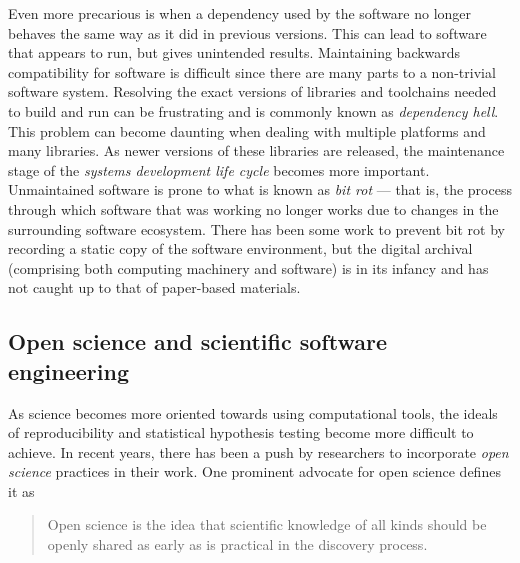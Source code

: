{ %
	Even more precarious is when a dependency used by the
	software no longer behaves the same way as it did in
	previous versions. This can lead to software that appears
	to run, but gives unintended results.  Maintaining
	backwards compatibility for software is difficult since
	there are many parts to a non-trivial software system.
	Resolving the exact versions of libraries and toolchains
	needed to build and run can be frustrating and is commonly
	known as \emph{dependency hell}. This problem can become
	daunting when dealing with multiple platforms and many
	libraries. As newer versions of these libraries are
	released, the maintenance stage of the \emph{systems
	development life cycle} becomes more important.
	Unmaintained software is prone to what is known as
	\emph{bit rot} --- that is, the process through which
	software that was working no longer works due to changes
	in the surrounding software ecosystem.
	There has been some work to prevent bit rot by recording a
	static copy of the software environment, but the digital
	archival (comprising both computing machinery and
	software) is in its infancy and has not caught up to that
	of paper-based materials.
}


\subsection{Open science and scientific software engineering}

As science becomes more oriented towards using computational
tools, the ideals of reproducibility and statistical hypothesis
testing become more difficult to achieve. In recent years, there
has been a push by researchers to incorporate \emph{open science}
practices in their work. One prominent advocate for open science
defines it as
\begin{quote}
	\begin{fancyquote}
	Open science is the idea that scientific knowledge of all kinds
	should be openly shared as early as is practical in the discovery
	process.
	\end{fancyquote}
\end{quote}

%

